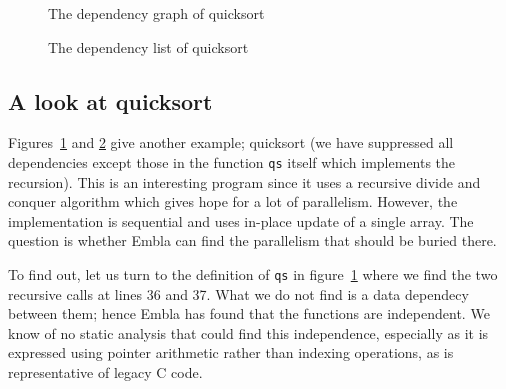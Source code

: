 \begin{figure} 
\small

\caption{The dependency graph of quicksort}
\label{fquickg}
\end{figure}

\begin{figure} 
\small

\caption{The dependency list of quicksort}
\label{fquickl}
\end{figure}

\subsection{A look at quicksort}

Figures~\ref{fquickg} and \ref{fquickl} give another example;
quicksort (we have suppressed all dependencies except those in the
function {\tt qs} itself which implements the recursion).
This is an interesting program since it uses a recursive divide and
conquer algorithm which gives hope for a lot of parallelism. However,
the implementation is sequential and uses in-place update of a single
array. The question is whether Embla can find the parallelism that
should be buried there. 

To find out, let us turn to the definition of {\tt qs} in
figure~\ref{fquickg} where we find the two recursive calls at lines 36
and 37. What we do not find is a data dependecy between them; hence
Embla has found that the functions are independent. We know of no 
static analysis that could find this independence, especially as it 
is expressed using pointer arithmetic rather than indexing operations,
as is representative of legacy C code.
